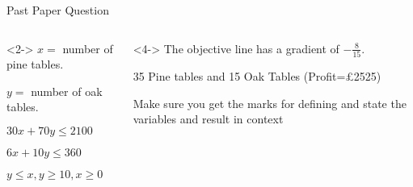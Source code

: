 \documentclass[8pt]{beamer}
\begin{document}
\begin{frame}[shrink=25]{Past Paper Question}
	\begin{columns}
	\begin{column}{.5\linewidth}
		\begin{solution}	
	$x=$ number of pine tables.

	 $y=$ number of oak tables.

	 $30x+70y \leq 2100$

	  $6x+10y \leq 360$

	   $y \leq x, y \geq 10, x \geq 0$ 
   \end{solution}
	\end{column}
	\begin{column}{.5\linewidth}
		\begin{solution}<4->
The objective line has a gradient of $-\frac{8}{15}$. 

35 Pine tables and 15 Oak Tables (Profit=£2525) 

\alert{Make sure you get the marks for defining and state the variables and result in context}
		\end{solution}
	\end{column}
	\end{columns}
\end{frame}
\end{document}
